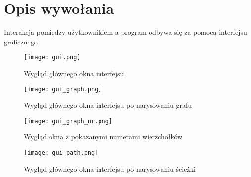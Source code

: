 \documentclass[]{article}
\begin{document}
\section{Opis wywołania}\label{header-n233}

Interakcja pomiędzy użytkownikiem a program odbywa się za pomocą interfejsu graficznego.

\begin{figure}[H]
\begin{center}
  \texttt{[image: gui.png]}
  \end{center}
  \caption{Wygląd głównego okna interfejsu}
  \label{fig:graf}
\end{figure}

\begin{figure}[H]
\begin{center}
  \texttt{[image: gui\_graph.png]}
  \end{center}
  \caption{Wygląd głównego okna interfejsu po narysowaniu grafu}
  \label{fig:graf}
\end{figure}

\begin{figure}[H]
\begin{center}
  \texttt{[image: gui\_graph\_nr.png]}
  \end{center}
  \caption{Wygląd okna z pokazanymi numerami wierzchołków}
  \label{fig:graf}
\end{figure}

\begin{figure}[H]
\begin{center}
  \texttt{[image: gui\_path.png]}
  \end{center}
  \caption{Wygląd głównego okna interfejsu po narysowaniu ścieżki}
  \label{fig:graf}
\end{figure}
\end{document}
